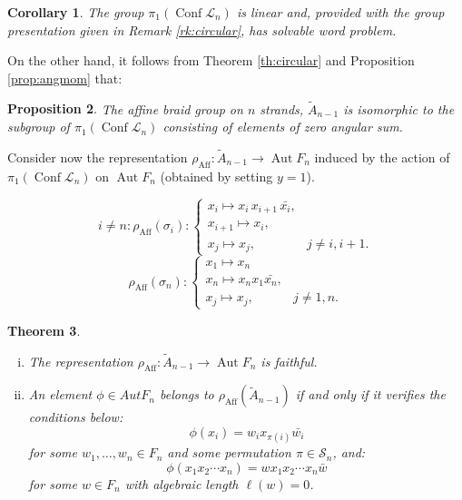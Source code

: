\documentclass[11pt]{amsart}
\newtheorem{theorem}{Theorem}
\newtheorem{proposition}[theorem]{Proposition}
\newtheorem{corollary}[theorem]{Corollary}
\begin{document}
\begin{corollary}
The group $\pi_1({\mathop{\mathrm{Conf}}\nolimits} \mathcal{L}_n)$ is linear and, provided with the group presentation given in Remark \ref{rk:circular}, has solvable word problem.
\end{corollary}

On the other hand, it follows from Theorem \ref{th:circular} and Proposition \ref{prop:angmom} that:

 
 
 \begin{proposition}
 The affine braid group on $n$ strands, $\tilde{A}_{n-1}$ is isomorphic to  the subgroup of  $\pi_1({\mathop{\mathrm{Conf}}\nolimits} \mathcal{L}_n)$
 consisting of elements of zero angular sum.
 \end{proposition}
 
 
 
Consider now the representation $\rho_{\mathop{\mathrm{Aff}}\nolimits} :  \tilde{A}_{n-1} \longrightarrow {\mathop{\mathrm{Aut}}\nolimits} F_n$ 
induced by the action of $\pi_1({\mathop{\mathrm{Conf}}\nolimits} \mathcal{L}_n)$ on ${\mathop{\mathrm{Aut}}\nolimits} F_n$ (obtained by setting $y=1$).
 
 
 
 $$ i\not=n:
\rho_{\mathop{\mathrm{Aff}}\nolimits} (\sigma_{i}) : \left\{
\begin{array}{ll}
x_{i} \longmapsto x_{i} \, x_{i+1} \, {\bar{{x_i}}}, &  \\ 
x_{i+1} \longmapsto x_{i}, & \\ 
x_{j} \longmapsto x_{j}, &  j\neq i,i+1.
\end{array} \right.
$$
$$
\rho_{\mathop{\mathrm{Aff}}\nolimits} (\sigma_{n}) : 
\left\{
\begin{array}{ll}
x_{1} \longmapsto  x_{n}  &  \\
x_{n} \longmapsto
x_{n} x_{1}  {\bar{{x_{n}}}} , & \\ 
x_{j} \longmapsto x_{j}, &  j\neq 1, n.
\end{array} \right.
$$

\begin{theorem}\label{thm:affine}

\begin{enumerate}[i)]
\item The representation  $\rho_{\mathop{\mathrm{Aff}}\nolimits} :  \tilde{A}_{n-1} \longrightarrow {\mathop{\mathrm{Aut}}\nolimits} F_n$  is faithful. 
\item An element $\phi \in Aut F_n$ belongs to $\rho_{\mathop{\mathrm{Aff}}\nolimits} (\tilde{A}_{n-1})$ if and only if it verifies the conditions below:
\begin{equation}
\label{eq:conj1bis}
\phi(x_i)=w_i x_{\pi(i)} {\bar{{w_i}}}  
\end{equation}
for some $w_1,\ldots,w_n \in F_n$ and some permutation $\pi \in \mathcal{S}_n$, and:
\begin{equation}
\label{eq:conj2bis}
\phi(x_1x_2\cdots x_n) = w  x_1x_2\cdots x_n {\bar{{w}}} 
\end{equation}
for some $w \in F_n$ with algebraic length $\ell(w)=0$.
\end{enumerate}
 \end{theorem}
\end{document}
